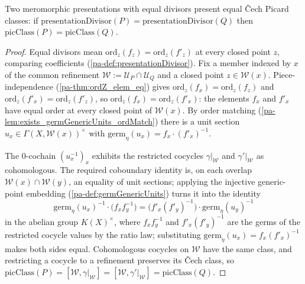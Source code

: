 \begin{theorem}
  \label{pa-thm:picClass_eq_of_presentationDivisor_eq}
  \leanok

  Two meromorphic presentations with equal divisors present equal \v Cech Picard classes: if
  \(\mathrm{presentationDivisor}(P) = \mathrm{presentationDivisor}(Q)\) then \(\mathrm{picClass}(P)
  = \mathrm{picClass}(Q)\).
\end{theorem}
\begin{proof}
  \leanok
  Equal divisors mean \(\mathrm{ord}_z(f_z) = \mathrm{ord}_z(f'_z)\) at every closed point \(z\),
  comparing coefficients (\ref{pa-def:presentationDivisor}). Fix a member indexed by \(x\) of the
  common refinement \(\mathcal W := \mathcal U_P \cap \mathcal U_Q\) and a closed point \(z \in
  \mathcal W(x)\). Piece-independence (\ref{pa-thm:ordZ_elem_eq}) gives \(\mathrm{ord}_z(f_x) =
  \mathrm{ord}_z(f_z)\) and \(\mathrm{ord}_z(f'_x) = \mathrm{ord}_z(f'_z)\), so \(\mathrm{ord}_z(f_x)
  = \mathrm{ord}_z(f'_x)\): the elements \(f_x\) and \(f'_x\) have equal order at every closed
  point of \(\mathcal W(x)\). By order matching (\ref{pa-lem:exists_germGenericUnits_ordMatch}) there
  is a unit section \(u_x \in \Gamma(X, \mathcal W(x))^{\times}\) with \(\mathrm{germ}_\eta(u_x) =
  f_x \cdot (f'_x)^{-1}\).

  The \(0\)-cochain \((u_x^{-1})_x\) exhibits the restricted cocycles \(\gamma|_{\mathcal W}\) and
  \(\gamma'|_{\mathcal W}\) as cohomologous. The required coboundary identity is, on each overlap
  \(\mathcal W(x) \cap \mathcal W(y)\), an equality of unit sections; applying the injective
  generic-point embedding (\ref{pa-def:germGenericUnits}) turns it into the identity
  \[
    \mathrm{germ}_\eta(u_x)^{-1} \cdot \bigl(f_x f_y^{-1}\bigr) = \bigl(f'_x (f'_y)^{-1}\bigr) \cdot
      \mathrm{germ}_\eta(u_y)^{-1}
  \]
  in the abelian group \(K(X)^{\times}\), where \(f_x f_y^{-1}\) and \(f'_x (f'_y)^{-1}\) are the
  germs of the restricted cocycle values by the ratio law; substituting \(\mathrm{germ}_\eta(u_x) =
  f_x (f'_x)^{-1}\) makes both sides equal. Cohomologous cocycles on \(\mathcal W\) have the same
  class, and restricting a cocycle to a refinement preserves its \v Cech class, so
  \(\mathrm{picClass}(P) = [\mathcal W, \gamma|_{\mathcal W}] = [\mathcal W, \gamma'|_{\mathcal W}]
  = \mathrm{picClass}(Q)\).
\end{proof}

